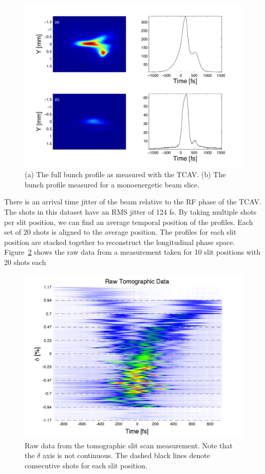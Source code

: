 \documentclass[%
twocolumn,
showpacs,preprintnumbers,
 aps,
prstab,
]{revtex4-1}
\begin{document}
\begin{figure}[hbt]
  \includegraphics[width=\columnwidth]{figures/tcav_slit2.pdf}
  \caption{(a) The full bunch profile as measured with the TCAV. (b) The bunch profile measured for a monoenergetic beam slice.}
  \label{tcav_slit}
\end{figure}

There is an arrival time jitter of the beam relative to the RF phase of the TCAV. The shots in this dataset have an RMS jitter of 124 fs. By taking multiple shots per slit position, we can find an average temporal position of the profiles. Each set of 20 shots is aligned to the average position. The profiles for each slit position are stacked together to reconstruct the longitudinal phase space. Figure~\ref{raw_data} shows the raw data from a measurement taken for 10 slit positions with 20 shots each

\begin{figure}[hbt]
  \includegraphics[width=\columnwidth]{figures/raw.pdf}
  \caption{Raw data from the tomographic slit scan measurement. Note that the $\delta$ axis is not continuous. The dashed black lines denote consecutive shots for each slit position.}
  \label{raw_data}
\end{figure}
\end{document}
